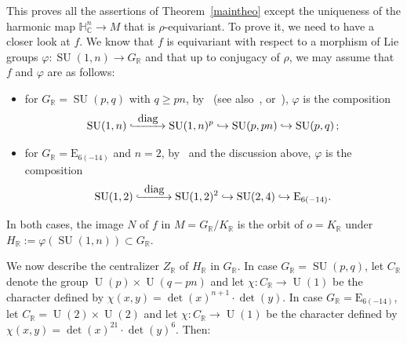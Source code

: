 \documentclass[JEP,XML,SOM,Unicode,NoFloatCountersInSection]{cedram}
\newcommand{\hto}{\mathrel{\lhook\joinrel\to}}
\newcommand{\To}[1]{\mathchoice{\xrightarrow{\textstyle\kern4pt#1\kern3pt}}{\stackrel{#1}{\longrightarrow}}{}{}}
\newcommand{\Hto}[1]{\mathrel{\lhook\joinrel\To{#1}}}
\newcommand{\citestar}[3]{\cite[#3]{#1}}
\theoremstyle{plain}
\theoremstyle{definition}
\DeclareMathOperator{\diag}{diag}
\DeclareMathOperator{\SU}{SU}
\DeclareMathOperator{\rU}{U}
\newcommand{\bR}{\mathbb{R}}
\newcommand{\HC}{{\mathbb{H}^n_\mathbb{C}}}
\begin{document}
This proves all the assertions of Theorem~\ref{maintheo}
except the uniqueness of the harmonic map $\HC\to M$ that is
$\rho$-equivariant. To prove
it, we need to have a closer look at $f$. We know that
$f$ is equivariant with respect to a morphism of
Lie groups $\varphi: \SU(1,n) \to G_\bR$ and that up to conjugacy of $\rho$, we may assume that $f$
and $\varphi$ are as follows:
\begin{itemize}
\item for $G_\bR=\SU(p,q)$ with $q\geq pn$, by~\citestar{KMrank2}*{} (see
also~\citestar{KM}*{Prop.\,4.10}, or~\cite{Hamlet}), $\varphi$ is the composition
$$
\SU(1,n)\Hto{\diag}
\SU(1,n)^p
\hto\SU(p,pn)\hto
\SU(p,q)\,;
$$

\item for $G_\bR=\mathrm{E}_{6(-14)}$ and $n=2$, by~\cite{Hamlet} and the discussion above,
$\varphi$ is the composition
$$
\SU(1,2) \Hto{\diag}
\SU(1,2)^2
\hto\SU(2,4)\hto \mathrm{E}_{6(-14)}.
$$
\end{itemize}

In both cases, the image $N$ of $f$ in $M=G_\bR/K_\bR$ is the orbit of $o=K_\bR$ under
$H_\bR:=\varphi(\SU(1,n))\subset G_\bR$.

We now describe the centralizer $Z_\bR$ of $H_\bR$ in $G_\bR$.
In case $G_\bR = \SU(p,q)$, let $C_\bR$ denote the group $\rU(p) \times \rU(q-pn)$ and let
$\chi: C_\bR \to \rU(1)$ be the character defined by $\chi(x,y)=\det(x)^{n+1} \cdot \det(y)$.
In case $G_\bR = \mathrm{E}_{6(-14)}$, let $C_\bR = \rU(2) \times \rU(2)$ and let $\chi: C_\bR \to \rU(1)$
be the character defined by $\chi(x,y)=\det(x)^{21} \cdot \det(y)^6$. Then:
\end{document}
